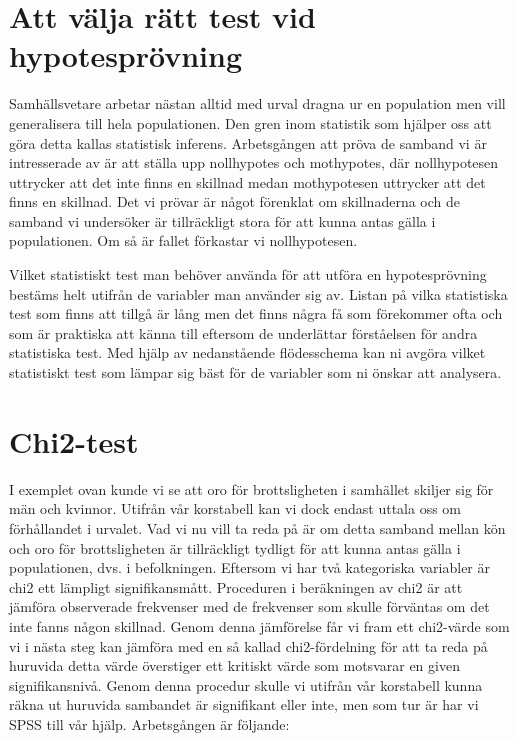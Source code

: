 \documentclass[
]{book}
\begin{document}
\hypertarget{att-vuxe4lja-ruxe4tt-test-vid-hypotespruxf6vning}{%
\chapter{Att välja rätt test vid hypotesprövning}\label{att-vuxe4lja-ruxe4tt-test-vid-hypotespruxf6vning}}

Samhällsvetare arbetar nästan alltid med urval dragna ur en population men vill generalisera till hela
populationen. Den gren inom statistik som hjälper oss att göra detta kallas statistisk inferens.
Arbetsgången att pröva de samband vi är intresserade av är att ställa upp nollhypotes och mothypotes,
där nollhypotesen uttrycker att det inte finns en skillnad medan mothypotesen uttrycker att det finns
en skillnad. Det vi prövar är något förenklat om skillnaderna och de samband vi undersöker är tillräckligt
stora för att kunna antas gälla i populationen. Om så är fallet förkastar vi nollhypotesen.

Vilket statistiskt test man behöver använda för att utföra en hypotesprövning bestäms helt utifrån de variabler man använder sig av.
Listan på vilka statistiska test som finns att tillgå är lång men det finns några få som förekommer ofta och som är praktiska att känna till
eftersom de underlättar förståelsen för andra statistiska test. Med hjälp av nedanstående flödesschema kan ni avgöra vilket statistiskt test som lämpar sig bäst för de variabler som ni önskar att analysera.

\hypertarget{chi2-test}{%
\chapter{Chi2-test}\label{chi2-test}}

I exemplet ovan kunde vi se att oro för brottsligheten i samhället skiljer sig för män och kvinnor. Utifrån
vår korstabell kan vi dock endast uttala oss om förhållandet i urvalet. Vad vi nu vill ta reda på är om detta
samband mellan kön och oro för brottsligheten är tillräckligt tydligt för att kunna antas gälla i
populationen, dvs. i befolkningen. Eftersom vi har två kategoriska variabler är chi2 ett lämpligt
signifikansmått. Proceduren i beräkningen av chi2 är att jämföra observerade frekvenser med de
frekvenser som skulle förväntas om det inte fanns någon skillnad. Genom denna jämförelse får vi fram
ett chi2-värde som vi i nästa steg kan jämföra med en så kallad chi2-fördelning för att ta reda på
huruvida detta värde överstiger ett kritiskt värde som motsvarar en given signifikansnivå. Genom denna
procedur skulle vi utifrån vår korstabell kunna räkna ut huruvida sambandet är signifikant eller inte,
men som tur är har vi SPSS till vår hjälp. Arbetsgången är följande:
\end{document}
